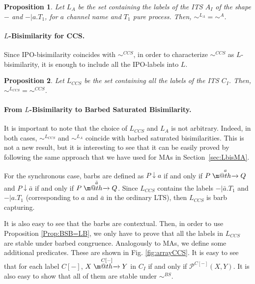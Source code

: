 \documentclass[copyright,creativecommons]{eptcs}
\makeatletter
\def\tr#1{\stackrel{#1}{\to}}
\let\oldrightarrow\to
\renewcommand{\to}[1][]{\ifthenelse{\equal{#1}{}}{\oldrightarrow}{\ensuremath{\xrightarrow{{}_{#1}}}}}
\def \rightarrowfill{\m@th\mathord{\smash-}\mkern-6mu\cleaders\hbox{$\mkern-2mu\mathord{\smash-}\mkern-2mu$}\hfill
  \mkern-6mu\mathord\rightarrow}
\newcommand{\bsbis}{\sim^{BS}}
\def\tr#1{\stackrel{#1}{\rightarrowfill}}
\newcommand{\<}{\langle}
\renewcommand{\>}{\rangle}
\def\tr#1{\stackrel{#1}{\rightarrowfill}}
\def \rightarrowfill{\m@th\mathord{\smash-}\mkern-6mu\cleaders\hbox{$\mkern-2mu\mathord{\smash-}\mkern-2mu$}\hfill
  \mkern-6mu\mathord\rightarrow}
\newtheorem{proposition}{Proposition}{}
\makeatother
\begin{document}
\begin{proposition}
  Let $L_{A}$ be the set containing the labels of the ITS $A_I$ of the
  shape $-$ and $- |a.T_1$, for $a$ channel name and $T_1$ pure
  process.  Then, $\sim^{L_{A}}=\sim^{A}$.
\end{proposition}

\paragraph{$L$-Bisimilarity for CCS.} Since IPO-bisimilarity coincides
with $\sim^{CCS}$, in order to characterize $\sim^{CCS}$ as
$L$-bisimilarity, it is enough to include all the IPO-labels into
$L$.



\begin{proposition}
Let $L_{CCS}$ be the set containing all the labels of the ITS $C_I$.
Then, $\sim^{L_{CCS}}=\sim^{CCS}$.
\end{proposition}

\paragraph{From $L$-Bisimilarity to Barbed Saturated Bisimilarity.}
It is important to note that the choice of $L_{CCS}$ and $L_A$ is
not arbitrary. Indeed, in both cases, $\sim^{L_{CCS}}$ and
$\sim^{L_A}$ coincide with barbed saturated bisimilarities. This is
not a new result, but it is interesting to see that it can be easily
proved by following the same approach that we have used for MAs in
Section~\ref{sec:LbisMA}.

For the synchronous case, barbs are defined as $P\downarrow a$ if and
only if
$P\tr{a}Q$ and $P\downarrow \bar{a}$ if and only if $P\tr{\bar{a}}Q$. Since
$L_{CCS}$ contains the labels $-|\bar{a}.T_1$ and $-|a.T_1$
(corresponding to $a$ and $\bar{a}$ in the ordinary LTS), then
$L_{CCS}$ is barb capturing.

It is also easy to see that the barbs are contextual. Then, in order
to use Proposition \ref{Prop:BSB=LB}, we only have to prove that all
the labels in $L_{CCS}$ are stable under barbed congruence.
Analogously to MAs, we define some additional predicates. These are
shown in Fig. \ref{fig:arrayCCS}. It is easy to see that for each
label $C[-]$, $X\tr{C[-]}Y$ in $C_I$ if and only if $\mathcal
P^{C[-]}(X,Y)$. It is also easy to show that all of them are stable
under $\bsbis$.
\end{document}

